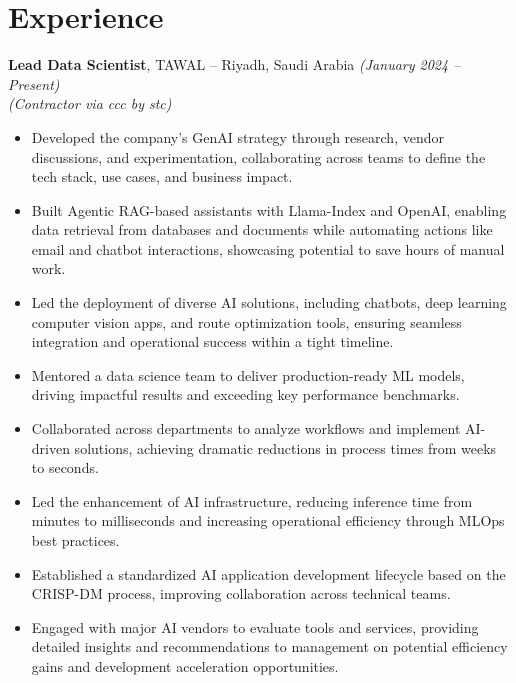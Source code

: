 \documentclass[10pt, letterpaper]{article}
\newenvironment{highlights}{
    \begin{itemize}[topsep=0.1cm, parsep=0.1cm, itemsep=0pt, leftmargin=1em]
}{
    \end{itemize}
}
\begin{document}
\section{Experience}
\textbf{Lead Data Scientist}, TAWAL -- Riyadh, Saudi Arabia \textit{(January 2024 – Present)} \\
\textit{(Contractor via ccc by stc)} \\
\begin{highlights}
    \item Developed the company’s GenAI strategy through research, vendor discussions, and experimentation, collaborating across teams to define the tech stack, use cases, and business impact.
    \item Built Agentic RAG-based assistants with Llama-Index and OpenAI, enabling data retrieval from databases and documents while automating actions like email and chatbot interactions, showcasing potential to save hours of manual work.
    \item Led the deployment of diverse AI solutions, including chatbots, deep learning computer vision apps, and route optimization tools, ensuring seamless integration and operational success within a tight timeline.
    \item Mentored a data science team to deliver production-ready ML models, driving impactful results and exceeding key performance benchmarks.
    \item Collaborated across departments to analyze workflows and implement AI-driven solutions, achieving dramatic reductions in process times from weeks to seconds.
    \item Led the enhancement of AI infrastructure, reducing inference time from minutes to milliseconds and increasing operational efficiency through MLOps best practices.
    \item Established a standardized AI application development lifecycle based on the CRISP-DM process, improving collaboration across technical teams.
    \item Engaged with major AI vendors to evaluate tools and services, providing detailed insights and recommendations to management on potential efficiency gains and development acceleration opportunities.
\end{highlights}

\vspace{0.3cm}
\end{document}
